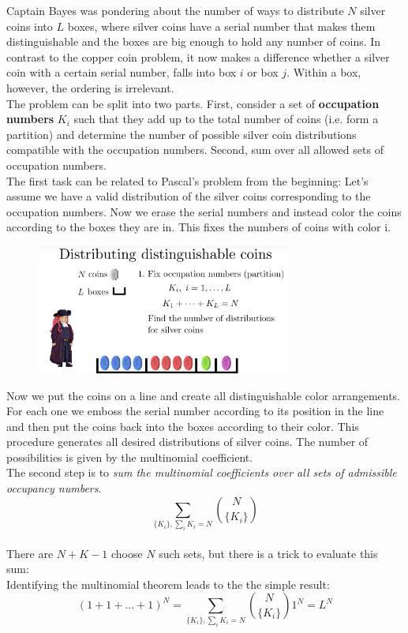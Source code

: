 \documentclass[12pt, a4paper]{scrartcl}
\begin{document}
Captain Bayes was pondering about the number of ways to distribute $N$ silver coins into $L$ boxes, where silver coins have a serial number that makes them distinguishable and the boxes are big enough to hold any number of coins.
In contrast to the copper coin problem, it now makes a difference whether a silver coin with a certain serial number, falls into box $i$ or box $j$. Within a box, however, the ordering is irrelevant.\\
The problem can be split into two parts. 
First, consider a set of \textbf{occupation numbers} $K_i$ such that they add up to the total number of coins (i.e. form a partition) and determine the number of possible silver coin distributions compatible with the occupation numbers.
Second, sum over all allowed sets of occupation numbers.  \\
The first task can be related to Pascal's problem from the beginning:
Let's assume we have a valid distribution of the silver coins corresponding to the occupation numbers.
Now we erase the serial numbers and instead color the coins according to the boxes they are in. This fixes the numbers of coins with color i.
\begin{figure}[H]
	\centering
	\includegraphics[width=0.75\textwidth]{4_14.png}
\end{figure}
Now we put the coins on a line and create all distinguishable color arrangements. For each one we emboss the serial number according to its position in the line and then put the coins back into the boxes according to their color. This procedure generates all desired distributions of silver coins.%
The number of possibilities is given by the multinomial coefficient.\\

The second step is to \textit{sum the multinomial coefficients over all sets of admissible occupancy numbers}. 
\begin{equation*}\boxed{\sum_{\{K_i\},\sum_iK_i=N}{N\choose\{K_i\}}
}\end{equation*}\\
There are $N+K-1$ choose $N$ such sets, but there is a trick to evaluate this sum:\\
Identifying the multinomial theorem leads to the the simple result: 
\begin{equation*}\boxed{(1+1+...+1)^N=\sum_{\{K_i\},\sum_iK_i=N}{N\choose\{K_i\}}1^N=L^N
}\end{equation*}\\
\end{document}
